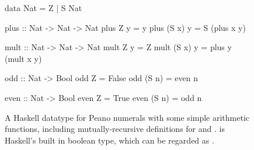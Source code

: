 \begin{figure}
  \begin{haskell}
    data Nat = Z
             | S Nat

    plus :: Nat -> Nat -> Nat
    plus    Z  y = y
    plus (S x) y = S (plus x y)

    mult :: Nat -> Nat -> Nat
    mult    Z  y = Z
    mult (S x) y = plus y (mult x y)

    odd :: Nat -> Bool
    odd    Z  = False
    odd (S n) = even n

    even :: Nat -> Bool
    even    Z  = True
    even (S n) = odd n
  \end{haskell}
  \caption{A Haskell datatype for Peano numerals with some simple arithmetic
    functions, including mutually-recursive definitions for  and
    .  is Haskell's built in boolean type, which can be
    regarded as .}
  \label{fig:haskellexample}
\end{figure}


